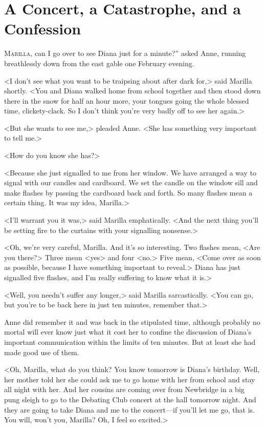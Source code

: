 \chapter{A Concert, a Catastrophe, and a Confession}
	
\lettrine[ante=“,]{M}{arilla}, can I go over to see Diana just for a minute?” asked Anne, running breathlessly down from the east gable one February evening.

\zz
<I don't see what you want to be traipsing about after dark for,> said Marilla shortly. <You and Diana walked home from school together and then stood down there in the snow for half an hour more, your tongues going the whole blessed time, clickety-clack. So I don't think you're very badly off to see her again.>

<But she wants to see me,> pleaded Anne. <She has something very important to tell me.>

<How do you know she has?>

<Because she just signalled to me from her window. We have arranged a way to signal with our candles and cardboard. We set the candle on the window sill and make flashes by passing the cardboard back and forth. So many flashes mean a certain thing. It was my idea, Marilla.>

<I'll warrant you it was,> said Marilla emphatically. <And the next thing you'll be setting fire to the curtains with your signalling nonsense.>

<Oh, we're very careful, Marilla. And it's so interesting. Two flashes mean, <Are you there?> Three mean <yes> and four <no.> Five mean, <Come over as soon as possible, because I have something important to reveal.> Diana has just signalled five flashes, and I'm really suffering to know what it is.>

<Well, you needn't suffer any longer,> said Marilla sarcastically. <You can go, but you're to be back here in just ten minutes, remember that.>

Anne did remember it and was back in the stipulated time, although probably no mortal will ever know just what it cost her to confine the discussion of Diana's important communication within the limits of ten minutes. But at least she had made good use of them.

<Oh, Marilla, what do you think? You know tomorrow is Diana's birthday. Well, her mother told her she could ask me to go home with her from school and stay all night with her. And her cousins are coming over from Newbridge in a big pung sleigh to go to the Debating Club concert at the hall tomorrow night. And they are going to take Diana and me to the concert—if you'll let me go, that is. You will, won't you, Marilla? Oh, I feel so excited.>

